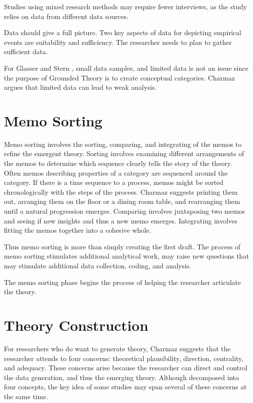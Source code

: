 Studies using mixed research methods may require fewer interviews, as the study relies on data from different data sources.

Data should give a full picture. Two key aspects of data for depicting empirical events are suitability and sufficiency.  The researcher needs to plan to gather sufficient data. 

For Glasser \cite{GlaserIssues} and Stern \cite{SternErodingGroundedTheory}, small data samples, and limited data is not an issue since the purpose of Grounded Theory is to create conceptual categories. Charmaz argues that limited data can lead to weak analysis. 
\section{Memo Sorting}
Memo sorting involves the sorting, comparing, and integrating of the memos to refine the emergent theory. Sorting involves examining different arrangements of the memos to determine which sequence clearly tells the story of the theory. Often memos describing properties of a category are sequenced around the category. If there is a time sequence to a process, memos might be sorted chronologically with the steps of the process. Charmaz suggests printing them out, arranging them on the floor or a dining room table, and rearranging them until a natural progression emerges. Comparing involves juxtaposing two memos and seeing if new insights and thus a new memo emerges. Integrating involves fitting the memos together into a cohesive whole. 

Thus memo sorting is more than simply creating the first draft. The process of memo sorting stimulates additional analytical work, may raise new questions that may stimulate additional data collection, coding, and analysis. 

The memo sorting phase begins the process of helping the researcher articulate the theory.

\section{Theory Construction}
For researchers who do want to generate theory, Charmaz suggests that the researcher attends to four concerns: theoretical plausibility, direction, centrality, and adequacy. These concerns arise because the researcher can direct and control the data generation, and thus the emerging theory. Although decomposed into four concepts, the key idea of some studies may span several of these concerns at the same time.


